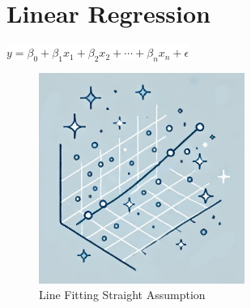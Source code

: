 \documentclass[
  12 pt,
  a4paper,
]{book}
\numberwithin{equation}{section}
\theoremstyle{plain}      %
\theoremstyle{definition} %
\theoremstyle{remark}     %
\theoremstyle{note}         %
\begin{document}
\hypertarget{linear-regression}{%
\chapter{Linear Regression}\label{linear-regression}}

\begin{center}
\colorbox{white}{\color{navyimpactblue} \huge $y = \beta_0 + \beta_1 x_1 + \beta_2 x_2 + \cdots + \beta_n x_n + \epsilon$}
\end{center}

\hfill\break

\begin{figure}[h!]
  \begin{center}
    \includegraphics[width=0.6\textwidth]{pictures/Whimsical-9-LR.jpeg}
    \caption*{\Large Line Fitting Straight Assumption}
  \end{center}
\end{figure}

\newpage

\vspace*{\fill}
\end{document}
